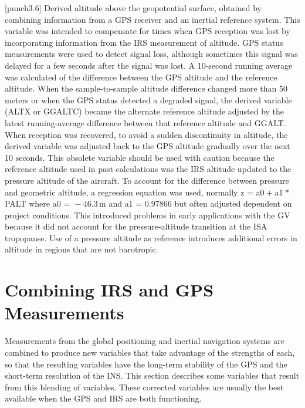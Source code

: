 \documentclass[
  english,
]{book}
\begin{document}
\protect\hypertarget{punch3.6}{}{{[}punch3.6{]}} Derived altitude above the geopotential surface, obtained by combining information from a GPS receiver and an inertial reference system. This variable was intended to compensate for times when GPS reception was lost by incorporating information from the IRS measurement of altitude. GPS status measurements were used to detect signal loss, although sometimes this signal was delayed for a few seconds after the signal was lost. A 10-second running average was calculated of the difference between the GPS altitude and the reference altitude. When the sample-to-sample altitude difference changed more than 50 meters or when the GPS status detected a degraded signal, the derived variable (ALTX or GGALTC) became the alternate reference altitude adjusted by the latest running-average difference between that reference altitude and GGALT. When reception was recovered, to avoid a sudden discontinuity in altitude, the derived variable was adjusted back to the GPS altitude gradually over the next 10 seconds.
This obsolete variable should be used with caution because the reference altitude used in past calculations was the IRS altitude updated to the pressure altitude of the aircraft. To account for the difference between pressure and geometric altitude, a regression equation was used, normally z = a0 + a1 * PALT where {a0 =  − 46.3} m and {a1 = 0.97866} but often adjusted dependent on project conditions. This introduced problems in early applications with the GV because it did not account for the pressure-altitude transition at the ISA tropopause. Use of a pressure altitude as reference introduces additional errors in altitude in regions that are not barotropic.

\hypertarget{combining-irs-and-gps-measurements}{%
\section{Combining IRS and GPS Measurements}\label{combining-irs-and-gps-measurements}}

Measurements from the global positioning and inertial navigation systems are combined to produce new variables that take advantage of the strengths of each, so that the resulting variables have the long-term stability of the GPS and the short-term resolution of the INS. This section describes some variables that result from this blending of variables. These corrected variables are usually the best available when the GPS and IRS are both functioning.
\end{document}
